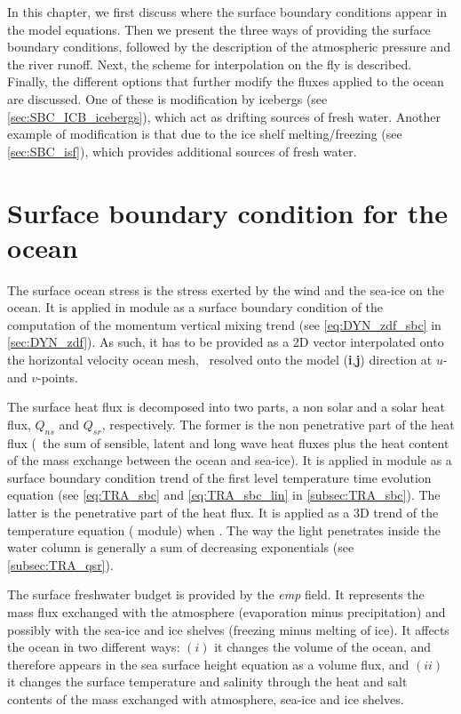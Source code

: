 \documentclass[../main/NEMO_manual]{subfiles}
\begin{document}
In this chapter, we first discuss where the surface boundary conditions appear in the model equations.
Then we present the three ways of providing the surface boundary conditions,
followed by the description of the atmospheric pressure and the river runoff.
Next, the scheme for interpolation on the fly is described.
Finally, the different options that further modify the fluxes applied to the ocean are discussed.
One of these is modification by icebergs (see \autoref{sec:SBC_ICB_icebergs}),
which act as drifting sources of fresh water.
Another example of modification is that due to the ice shelf melting/freezing (see \autoref{sec:SBC_isf}),
which provides additional sources of fresh water.

\section{Surface boundary condition for the ocean}
\label{sec:SBC_ocean}

The surface ocean stress is the stress exerted by the wind and the sea-ice on the ocean.
It is applied in  module as a surface boundary condition of the computation of
the momentum vertical mixing trend (see \autoref{eq:DYN_zdf_sbc} in \autoref{sec:DYN_zdf}).
As such, it has to be provided as a 2D vector interpolated onto the horizontal velocity ocean mesh,
\ie\ resolved onto the model (\textbf{i},\textbf{j}) direction at $u$- and $v$-points.

The surface heat flux is decomposed into two parts, a non solar and a solar heat flux,
$Q_{ns}$ and $Q_{sr}$, respectively.
The former is the non penetrative part of the heat flux
(\ie\ the sum of sensible, latent and long wave heat fluxes plus
the heat content of the mass exchange between the ocean and sea-ice).
It is applied in  module as a surface boundary condition trend of
the first level temperature time evolution equation
(see \autoref{eq:TRA_sbc} and \autoref{eq:TRA_sbc_lin} in \autoref{subsec:TRA_sbc}).
The latter is the penetrative part of the heat flux.
It is applied as a 3D trend of the temperature equation ( module) when
.
The way the light penetrates inside the water column is generally a sum of decreasing exponentials
(see \autoref{subsec:TRA_qsr}).

The surface freshwater budget is provided by the \textit{emp} field.
It represents the mass flux exchanged with the atmosphere (evaporation minus precipitation) and
possibly with the sea-ice and ice shelves (freezing minus melting of ice).
It affects the ocean in two different ways:
$(i)$  it changes the volume of the ocean, and therefore appears in the sea surface height equation as		%
a volume flux, and
$(ii)$ it changes the surface temperature and salinity through the heat and salt contents of
the mass exchanged with atmosphere, sea-ice and ice shelves.
\end{document}

